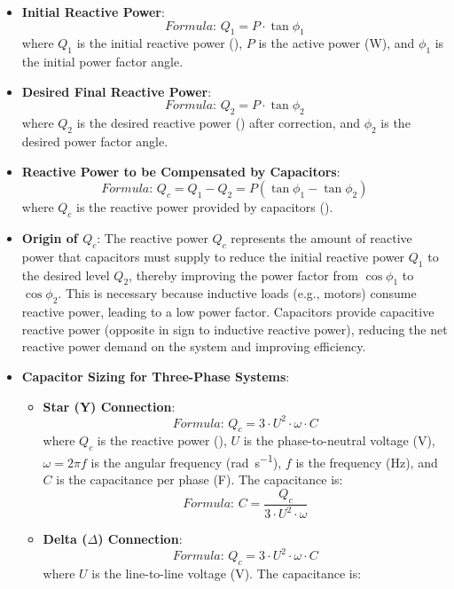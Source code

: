 \documentclass[12pt]{article}
\newcommand{\formula}[1]{\textit{Formula: }#1}
\begin{document}
\begin{itemize}
    \item \textbf{Initial Reactive Power}: 
        \[
        \formula{Q_1 = P \cdot \tan \phi_1}
        \]
        where \(Q_1\) is the initial reactive power (\si{\voltampereactive}), \(P\) is the active power (\si{\watt}), and \(\phi_1\) is the initial power factor angle.
    \item \textbf{Desired Final Reactive Power}:
        \[
        \formula{Q_2 = P \cdot \tan \phi_2}
        \]
        where \(Q_2\) is the desired reactive power (\si{\voltampereactive}) after correction, and \(\phi_2\) is the desired power factor angle.
    \item \textbf{Reactive Power to be Compensated by Capacitors}:
        \[
        \formula{Q_c = Q_1 - Q_2 = P (\tan \phi_1 - \tan \phi_2)}
        \]
        where \(Q_c\) is the reactive power provided by capacitors (\si{\voltampereactive}).
    \item \textbf{Origin of \(Q_c\)}: The reactive power \(Q_c\) represents the amount of reactive power that capacitors must supply to reduce the initial reactive power \(Q_1\) to the desired level \(Q_2\), thereby improving the power factor from \(\cos \phi_1\) to \(\cos \phi_2\). This is necessary because inductive loads (e.g., motors) consume reactive power, leading to a low power factor. Capacitors provide capacitive reactive power (opposite in sign to inductive reactive power), reducing the net reactive power demand on the system and improving efficiency.
    \item \textbf{Capacitor Sizing for Three-Phase Systems}:
        \begin{itemize}
            \item \textbf{Star (Y) Connection}:
                \[
                \formula{Q_c = 3 \cdot U^2 \cdot \omega \cdot C}
                \]
                where \(Q_c\) is the reactive power (\si{\voltampereactive}), \(U\) is the phase-to-neutral voltage (\si{\volt}), \(\omega = 2 \pi f\) is the angular frequency (\si{\radian\per\second}), \(f\) is the frequency (\si{\hertz}), and \(C\) is the capacitance per phase (\si{\farad}). The capacitance is:
                \[
                \formula{C = \frac{Q_c}{3 \cdot U^2 \cdot \omega}}
                \]
            \item \textbf{Delta (\(\Delta\)) Connection}:
                \[
                \formula{Q_c = 3 \cdot U^2 \cdot \omega \cdot C}
                \]
                where \(U\) is the line-to-line voltage (\si{\volt}). The capacitance is:

\end{itemize}
\end{itemize}
\end{document}
